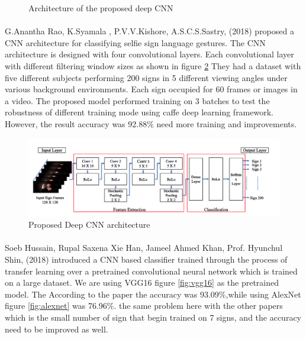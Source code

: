 \documentclass[12pt]{report}
\begin{document}
\begin{figure}
\begin{subfigure}[b]{0.3\textwidth}
                        \end{subfigure}
                        \caption{Architecture of the proposed deep CNN }\label{fig:tiny_architecture}
                    \end{figure}

                \newpage

            \paragraph{}
                G.Anantha Rao, K.Syamala , P.V.V.Kishore, A.S.C.S.Sastry, (2018)
                proposed a CNN architecture for classifying selfie sign language gestures. 
                The CNN architecture is designed with four convolutional layers. Each convolutional 
                layer with different filtering window sizes as shown in figure \ref{fig:selfie}  
                They had a dataset with five different subjects performing 200 signs in 5 different viewing angles 
                under various background environments. Each sign occupied for 60 frames or images in a video.
                The proposed model performed training on 3 batches to test the robustness of different training mode 
                using caffe deep learning framework. However, the result accuracy was 92.88\% need more training and improvements. 
    
                    \begin{figure}[h]
                        \centering
                        \includegraphics[width=\textwidth]{./images/selfie.png}
                        \caption{Proposed Deep CNN architecture}
                        \label{fig:selfie}
                    \end{figure}

                 \newpage
            
            \paragraph{}
                Soeb Hussain, Rupal Saxena Xie Han, Jameel Ahmed Khan, Prof. Hyunchul Shin, (2018)
                introduced a CNN based classifier  trained through the process of transfer learning
                over a pretrained convolutional neural network which is trained on a large dataset.
                We are using VGG16 figure \ref{fig:vgg16} as the pretrained model.
                The According to the paper the accuracy was 93.09\%,while using AlexNet 
                figure \ref{fig:alexnet} was 76.96\%. the same problem here with the other papers 
                which is the small number of sign that begin trained on 7 signs, and the accuracy
                need to be improved as well.
\end{document}
